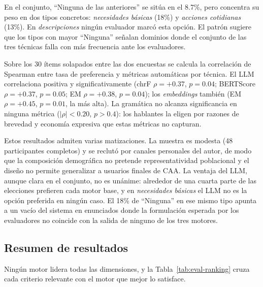En el conjunto, ``Ninguna de las anteriores'' se sitúa en el 8.7\%, pero concentra su peso en dos tipos concretos: \textit{necesidades básicas} (18\%) y \textit{acciones cotidianas} (13\%). En \textit{descripciones} ningún evaluador marcó esta opción. El patrón sugiere que los tipos con mayor ``Ninguna'' señalan dominios donde el conjunto de las tres técnicas falla con más frecuencia ante los evaluadores.

Sobre los 30 ítems solapados entre las dos encuestas se calcula la correlación de Spearman entre tasa de preferencia y métricas automáticas por técnica. El LLM correlaciona positiva y significativamente (chrF $\rho = +0.37$, $p = 0.04$; BERTScore $\rho = +0.37$, $p = 0.05$; EM $\rho = +0.38$, $p = 0.04$); los \textit{embeddings} también (EM $\rho = +0.45$, $p = 0.01$, la más alta). La gramática no alcanza significancia en ninguna métrica ($|\rho| < 0.20$, $p > 0.4$): los hablantes la eligen por razones de brevedad y economía expresiva que estas métricas no capturan.

Estos resultados admiten varias matizaciones. La muestra es modesta (48 participantes completos) y se reclutó por canales personales del autor, de modo que la composición demográfica no pretende representatividad poblacional y el diseño no permite generalizar a usuarios finales de CAA. La ventaja del LLM, aunque clara en el conjunto, no es unánime: alrededor de una cuarta parte de las elecciones prefieren cada motor base, y en \textit{necesidades básicas} el LLM no es la opción preferida en ningún caso. El 18\% de ``Ninguna'' en ese mismo tipo apunta a un vacío del sistema en enunciados donde la formulación esperada por los evaluadores no coincide con la salida de ninguno de los tres motores.

\subsection{Resumen de resultados}

Ningún motor lidera todas las dimensiones, y la Tabla~\ref{tab:eval-ranking} cruza cada criterio relevante con el motor que mejor lo satisface.

